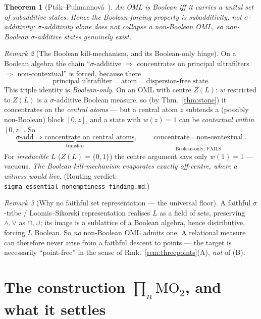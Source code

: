 \documentclass[11pt]{article}
\newtheorem{theorem}{Theorem}[section]
\theoremstyle{definition}
\theoremstyle{remark}
\newtheorem{remark}[theorem]{Remark}
\newcommand{\MOO}{\mathrm{MO}_2}
\begin{document}
\begin{theorem}[Pt\'ak--Pulmannov\'a~\cite{PtakPulmannova1994}]\label{thm:pp}
An OML is Boolean iff it carries a unital set of \emph{subadditive} states. Hence the
Boolean-forcing property is \emph{subadditivity}, \emph{not} $\sigma$-additivity:
$\sigma$-additivity alone does not collapse a non-Boolean OML, so non-Boolean
$\sigma$-additive states genuinely exist.
\end{theorem}

\begin{remark}[The Boolean kill-mechanism, and its Boolean-only hinge]\label{rem:transfer}
On a Boolean algebra the chain ``$\sigma$-additive $\Rightarrow$ concentrates on
principal ultrafilters $\Rightarrow$ non-contextual'' is forced, because there
\[
  \text{principal ultrafilter} = \text{atom} = \text{dispersion-free state}.
\]
This triple identity is \emph{Boolean-only}. On an OML with centre $Z(L)$:
$w$ restricted to $Z(L)$ is a $\sigma$-additive Boolean measure, so (by
Thm.~\ref{thm:stone}) it concentrates on the \emph{central atoms} --- but a central
atom $z$ subtends a (possibly non-Boolean) block $[0,z]$, and a state with
$w(z)=1$ can be \emph{contextual within} $[0,z]$. So
\[
  \underbrace{\sigma\text{-add}\Rightarrow\text{concentrate on central atoms}}_{\text{transfers}},
  \qquad
  \underbrace{\text{concentrate}\Rightarrow\text{non-contextual}}_{\text{Boolean-only; FAILS}}.
\]
For \emph{irreducible} $L$ ($Z(L)=\{0,1\}$) the centre argument says only $w(1)=1$
--- vacuous. \emph{The Boolean kill-mechanism evaporates exactly off-centre, where a
witness would live.} (Routing verdict: \texttt{sigma\_essential\_nonemptiness\_finding.md}.)
\end{remark}

\begin{remark}[Why no faithful set representation --- the universal floor]\label{rem:nofaithful}
A faithful $\sigma$-tribe / Loomis--Sikorski representation realises $L$ as a field
of sets, preserving $\wedge,\vee$ as $\cap,\cup$; its image is a sublattice of a
Boolean algebra, hence distributive, forcing $L$ Boolean. So \emph{no} non-Boolean
OML admits one. A relational measure can therefore never arise from a faithful
descent to points --- the target is necessarily ``point-free'' in the sense of
Rmk.~\ref{rem:threepoints}(A), \emph{not} of (B).
\end{remark}

\section{The construction $\prod_n\MOO$, and what it settles}\label{sec:product}
\end{document}
